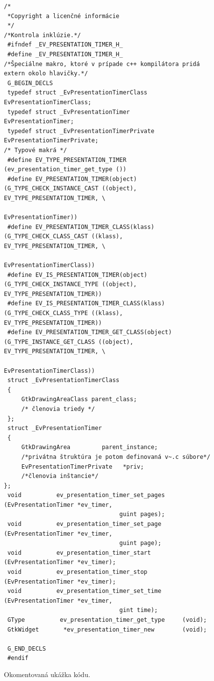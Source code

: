 \documentclass[12pt,oneside,final]{fithesis2}
\begin{document}
\begin{figure}[hbpt]
\begin{tiny}
\begin{verbatim}
/*
 *Copyright a licenčné informácie
 */
/*Kontrola inklúzie.*/
 #ifndef _EV_PRESENTATION_TIMER_H_
 #define _EV_PRESENTATION_TIMER_H_
/*Špeciálne makro, ktoré v prípade c++ kompilátora pridá extern okolo hlavičky.*/
 G_BEGIN_DECLS
 typedef struct _EvPresentationTimerClass    EvPresentationTimerClass;
 typedef struct _EvPresentationTimer         EvPresentationTimer;
 typedef struct _EvPresentationTimerPrivate  EvPresentationTimerPrivate;
/* Typové makrá */
 #define EV_TYPE_PRESENTATION_TIMER         (ev_presentation_timer_get_type ())
 #define EV_PRESENTATION_TIMER(object)      (G_TYPE_CHECK_INSTANCE_CAST ((object), EV_TYPE_PRESENTATION_TIMER, \
                                             EvPresentationTimer))
 #define EV_PRESENTATION_TIMER_CLASS(klass) (G_TYPE_CHECK_CLASS_CAST ((klass), EV_TYPE_PRESENTATION_TIMER, \
                                             EvPresentationTimerClass))
 #define EV_IS_PRESENTATION_TIMER(object)   (G_TYPE_CHECK_INSTANCE_TYPE ((object), EV_TYPE_PRESENTATION_TIMER))
 #define EV_IS_PRESENTATION_TIMER_CLASS(klass)  (G_TYPE_CHECK_CLASS_TYPE ((klass), EV_TYPE_PRESENTATION_TIMER))
 #define EV_PRESENTATION_TIMER_GET_CLASS(object) (G_TYPE_INSTANCE_GET_CLASS ((object), EV_TYPE_PRESENTATION_TIMER, \
                                                  EvPresentationTimerClass))
 struct _EvPresentationTimerClass
 {
     GtkDrawingAreaClass parent_class;
     /* členovia triedy */
 };
 struct _EvPresentationTimer 
 {
     GtkDrawingArea         parent_instance;
     /*privátna štruktúra je potom definovaná v~.c súbore*/
     EvPresentationTimerPrivate   *priv;
     /*členovia inštancie*/ 
};
 void          ev_presentation_timer_set_pages     (EvPresentationTimer *ev_timer,
                                 guint pages);
 void          ev_presentation_timer_set_page     (EvPresentationTimer *ev_timer,
                                 guint page);
 void          ev_presentation_timer_start       (EvPresentationTimer *ev_timer);
 void          ev_presentation_timer_stop       (EvPresentationTimer *ev_timer);
 void          ev_presentation_timer_set_time     (EvPresentationTimer *ev_timer,
                                 gint time);
 GType          ev_presentation_timer_get_type     (void);
 GtkWidget       *ev_presentation_timer_new        (void);
 
 G_END_DECLS
 #endif
\end{verbatim}
\end{tiny}
\caption{Okomentovaná ukážka kódu.}
\label{ev-presentation-timer.h}
\end{figure}
\end{document}
